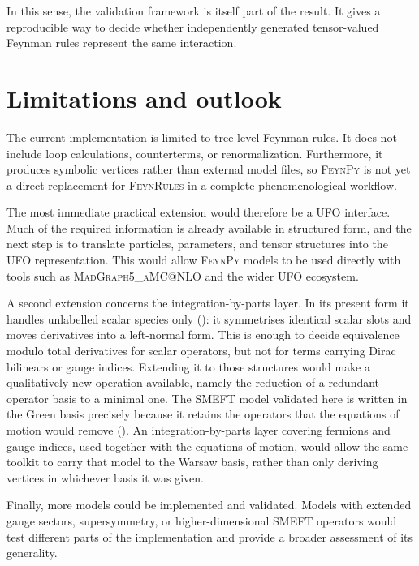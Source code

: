 In this sense, the validation framework is itself part of the result. It gives a reproducible way to decide whether independently generated tensor-valued Feynman rules represent the same interaction.

\section{Limitations and outlook}
\label{sec:conclusion-limitations}
\label{sec:conclusion-future}

The current implementation is limited to tree-level Feynman rules. It does not include loop calculations, counterterms, or renormalization. Furthermore, it produces symbolic vertices rather than external model files, so \textsc{FeynPy} is not yet a direct replacement for \textsc{FeynRules} in a complete phenomenological workflow.


The most immediate practical extension would therefore be a UFO interface. Much of the required information is already available in structured form, and the next step is to translate particles, parameters, and tensor structures into the UFO representation. This would allow \textsc{FeynPy} models to be used directly with tools such as \textsc{MadGraph5\_aMC@NLO} and the wider UFO ecosystem.

A second extension concerns the integration-by-parts layer. In its present form it handles unlabelled scalar species only (): it symmetrises identical scalar slots and moves derivatives into a left-normal form. This is enough to decide equivalence modulo total derivatives for scalar operators, but not for terms carrying Dirac bilinears or gauge indices. Extending it to those structures would make a qualitatively new operation available, namely the reduction of a redundant operator basis to a minimal one. The SMEFT model validated here is written in the Green basis precisely because it retains the operators that the equations of motion would remove (). An integration-by-parts layer covering fermions and gauge indices, used together with the equations of motion, would allow the same toolkit to carry that model to the Warsaw basis, rather than only deriving vertices in whichever basis it was given.

Finally, more models could be implemented and validated. Models with extended gauge sectors, supersymmetry, or higher-dimensional SMEFT operators would test different parts of the implementation and provide a broader assessment of its generality.

